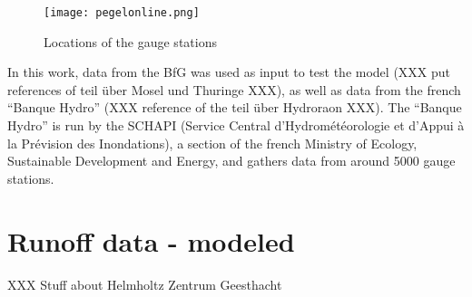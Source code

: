 \begin{figure}[H]
\centering
\texttt{[image: pegelonline.png]}
\caption[Locations of the gauge stations]{Locations of the gauge stations \cite{pegelonline}}
\label{pegelonline}
\end{figure}

In this work, data from the BfG was used as input to test the model (XXX put references of teil über Mosel und Thuringe XXX), as well as data from the french ``Banque Hydro'' (XXX reference of the teil über Hydroraon XXX). The ``Banque Hydro'' is run by the SCHAPI (Service Central d'Hydrométéorologie et d'Appui à la Prévision des Inondations), a section of the french Ministry of Ecology, Sustainable Development and Energy, and gathers data from around 5000 gauge stations.

\section{Runoff data - modeled}

XXX Stuff about Helmholtz Zentrum Geesthacht